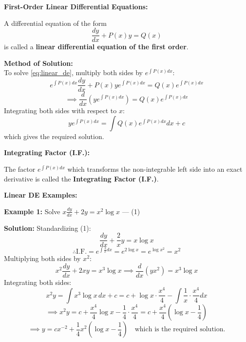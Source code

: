 \documentclass[11pt,a4paper]{article}
\newcommand{\Heading}[1]{\vspace{0.3cm}\noindent\textbf{\textcolor{AcademicGreen}{\large #1}}\par\vspace{0.15cm}}
\begin{document}
\Heading{First-Order Linear Differential Equations:}
A differential equation of the form
\begin{equation}
    \frac{dy}{dx} + P(x)y = Q(x) \label{eq:linear_de}
\end{equation}
is called a \textbf{linear differential equation of the first order}.

\vspace{0.2cm}
\noindent\textbf{Method of Solution:} \\
To solve \eqref{eq:linear_de}, multiply both sides by $e^{\int P(x)dx}$:
\[
e^{\int P(x)dx}\frac{dy}{dx} + P(x)y e^{\int P(x)dx} = Q(x)e^{\int P(x)dx}
\]
\[
\implies \frac{d}{dx}\left(y e^{\int P(x)dx}\right) = Q(x)e^{\int P(x)dx}
\]
Integrating both sides with respect to $x$:
\[
y e^{\int P(x)dx} = \int Q(x) e^{\int P(x)dx} dx + c
\]
which gives the required solution.

\Heading{Integrating Factor (I.F.):}
The factor $e^{\int P(x)dx}$ which transforms the non-integrable left side into an exact derivative is called the \textbf{Integrating Factor (I.F.)}.

\newpage

\Heading{Linear DE Examples:}

\begin{tcolorbox}[greenbox]
    \textbf{\textcolor{AcademicGreen}{Example 1:}} Solve $x\frac{dy}{dx} + 2y = x^2 \log x$ \quad --- (1)
    
    \vspace{0.15cm}
    \noindent\textbf{Solution:} Standardizing (1):
    \[
    \frac{dy}{dx} + \frac{2}{x}y = x \log x
    \]
    \[
    \therefore \text{I.F.} = e^{\int \frac{2}{x} dx} = e^{2\log x} = e^{\log x^2} = x^2
    \]
    Multiplying both sides by $x^2$:
    \[
    x^2\frac{dy}{dx} + 2xy = x^3 \log x \implies \frac{d}{dx}(y x^2) = x^3 \log x
    \]
    Integrating both sides:
    \[
    x^2 y = \int x^3 \log x \, dx + c = c + \log x \cdot \frac{x^4}{4} - \int \frac{1}{x} \cdot \frac{x^4}{4} dx
    \]
    \[
    \implies x^2 y = c + \frac{x^4}{4}\log x - \frac{1}{4} \cdot \frac{x^4}{4} = c + \frac{x^4}{4}\left(\log x - \frac{1}{4}\right)
    \]
    \[
    \implies y = c x^{-2} + \frac{1}{4}x^2\left(\log x - \frac{1}{4}\right) \quad \text{which is the required solution.}
    \]
\end{tcolorbox}
\end{document}
